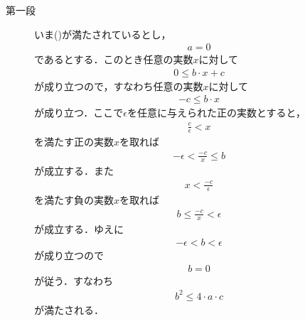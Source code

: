 	\begin{sketch}\mbox{}
		\begin{description}
			\item[第一段]
				いま()が満たされているとし，
				\begin{align}
					a=0
				\end{align}
				であるとする．このとき任意の実数$x$に対して
				\begin{align}
					0 \leq b \cdot x + c
				\end{align}
				が成り立つので，すなわち任意の実数$x$に対して
				\begin{align}
					-c \leq b \cdot x
				\end{align}
				が成り立つ．ここで$\epsilon$を任意に与えられた正の実数とすると，
				\begin{align}
					\frac{c}{\epsilon} < x
				\end{align}
				を満たす正の実数$x$を取れば
				\begin{align}
					- \epsilon < \frac{-c}{x} \leq b
				\end{align}
				が成立する．また
				\begin{align}
					x < \frac{-c}{\epsilon}
				\end{align}
				を満たす負の実数$x$を取れば
				\begin{align}
					b \leq \frac{-c}{x} < \epsilon
				\end{align}
				が成立する．ゆえに
				\begin{align}
					-\epsilon < b < \epsilon
				\end{align}
				が成り立つので
				\begin{align}
					b = 0
				\end{align}
				が従う．すなわち
				\begin{align}
					b^{2} \leq 4 \cdot a \cdot c
				\end{align}
				が満たされる．
				

\end{description}
\end{sketch}
